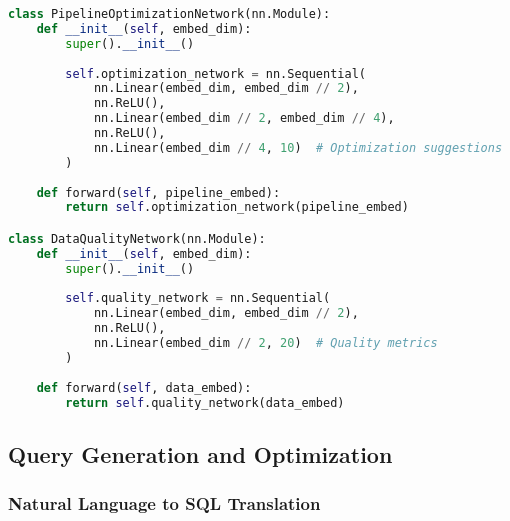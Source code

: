 \begin{lstlisting}[language=Python, caption=Data transformation and ETL tokenization]
class PipelineOptimizationNetwork(nn.Module):
    def __init__(self, embed_dim):
        super().__init__()
        
        self.optimization_network = nn.Sequential(
            nn.Linear(embed_dim, embed_dim // 2),
            nn.ReLU(),
            nn.Linear(embed_dim // 2, embed_dim // 4),
            nn.ReLU(),
            nn.Linear(embed_dim // 4, 10)  # Optimization suggestions
        )
        
    def forward(self, pipeline_embed):
        return self.optimization_network(pipeline_embed)

class DataQualityNetwork(nn.Module):
    def __init__(self, embed_dim):
        super().__init__()
        
        self.quality_network = nn.Sequential(
            nn.Linear(embed_dim, embed_dim // 2),
            nn.ReLU(),
            nn.Linear(embed_dim // 2, 20)  # Quality metrics
        )
        
    def forward(self, data_embed):
        return self.quality_network(data_embed)
\end{lstlisting}

\subsection{Query Generation and Optimization}

\subsubsection{Natural Language to SQL Translation}


